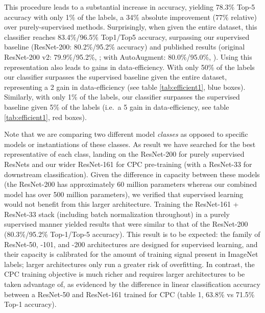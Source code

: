 \documentclass{article}
\begin{document}
This procedure leads to a substantial increase in accuracy, yielding 78.3\% Top-5 accuracy with only 1\% of the labels, a 34\% absolute improvement (77\% relative) over purely-supervised methods. Surprisingly, when given the entire dataset, this classifier reaches 83.4\%/96.5\% Top1/Top5 accuracy, surpassing our supervised baseline (ResNet-200: 80.2\%/95.2\% accuracy) and published results (original ResNet-200 v2: 79.9\%/95.2\%, \citet{he2016identity}; with AutoAugment:  80.0\%/95.0\%,  \citet{cubuk2018autoaugment}). Using this representation also leads to gains in data-efficiency. With only 50\% of the labels our classifier surpasses the supervised baseline given the entire dataset, representing a 2 gain in data-efficiency (see table \ref{tab:efficient1}, blue boxes). Similarly, with only 1\% of the labels, our classifier surpasses the supervised baseline given 5\% of the labels (i.e.\ a 5 gain in data-efficiency, see table \ref{tab:efficient1}, red boxes).

Note that we are comparing two different model \textit{classes} as opposed to specific models or instantiations of these classes. As result we have searched for the best representative of each class, landing on the ResNet-200 for purely supervised ResNets and our wider ResNet-161 for CPC pre-training (with a ResNet-33 for downstream classification). Given the difference in capacity between these models (the ResNet-200 has approximately 60 million parameters whereas our combined model has over 500 million parameters), we verified that supervised learning would not benefit from this larger architecture. Training the ResNet-161 + ResNet-33 stack (including batch normalization throughout) in a purely supervised manner yielded results that were similar to that of the ResNet-200 (80.3\%/95.2\% Top-1/Top-5 accuracy). This result is to be expected: the family of ResNet-50, -101, and -200 architectures are designed for supervised learning, and their capacity is calibrated for the amount of training signal present in ImageNet labels; larger architectures only run a greater risk of overfitting. In contrast, the CPC training objective is much richer and requires larger architectures to be taken advantage of, as evidenced by the difference in linear classification accuracy between a ResNet-50 and ResNet-161 trained for CPC (table 1, 63.8\% vs 71.5\% Top-1 accuracy). 
\end{document}
